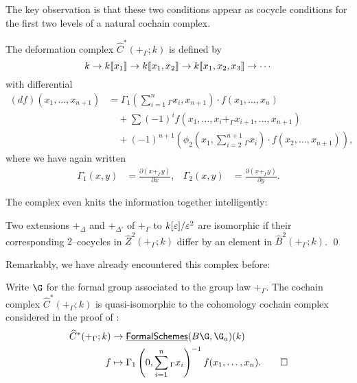 The key observation is that these two conditions appear as cocycle conditions for the first two levels of a natural cochain complex.
\begin{definition}
The deformation complex $\widehat C^*(+_\Gamma; k)$ is defined by \[k \to k\llbracket{x_1}\rrbracket \to k\llbracket{x_1, x_2}\rrbracket \to k\llbracket{x_1, x_2, x_3}\rrbracket \to \cdots\] with differential
\begin{align*}
(df)(x_1, \ldots, x_{n+1}) & = \Gamma_1\left(\sum_{i=1}^n {}_\Gamma x_i, x_{n+1} \right) \cdot f(x_1, \ldots, x_n) \\
& \quad + \sum (-1)^i f(x_1, \ldots, x_i +_\Gamma x_{i+1}, \ldots, x_{n+1}) \\
& \quad + (-1)^{n+1} \left( \phi_2\left(x_1, \sum_{i=2}^{n+1} {}_\Gamma x_i \right) \cdot f(x_2, \ldots, x_{n+1}) \right),
\end{align*}
where we have again written
\begin{align*}
\Gamma_1(x, y) & = \frac{\partial(x +_\Gamma y)}{\partial x}, &
\Gamma_2(x, y) & = \frac{\partial(x +_\Gamma y)}{\partial y}.
\end{align*}
\end{definition}

The complex even knits the information together intelligently:

\begin{corollary}\label{InterpretLTCoboundaries}
Two extensions $+_\Delta$ and $+_{\Delta'}$ of $+_\Gamma$ to $k[\varepsilon] / \varepsilon^2$ are isomorphic if their corresponding $2$--cocycles in $\widehat{Z}^2(+_\Gamma; k)$ differ by an element in $\widehat B^2(+_\Gamma; k)$. \qed
\end{corollary}

Remarkably, we have already encountered this complex before:

\begin{lemma}\label{LazarevComparisonOfCplxes}
Write $\G$ for the formal group associated to the group law $+_\Gamma$.  The cochain complex $\widehat C^*(+_\Gamma; k)$ is quasi-isomorphic to the cohomology cochain complex considered in the proof of :
\begin{align*}
\widehat C^*(+_\Gamma; k) & \to \InternalHom{FormalSchemes}(B\G, \G_a)(k) \\
f & \mapsto \Gamma_1\left(0, \sum_{i=1}^n{}_\Gamma x_i \right)^{-1} f(x_1, \ldots, x_n). \qed
\end{align*}
\end{lemma}

